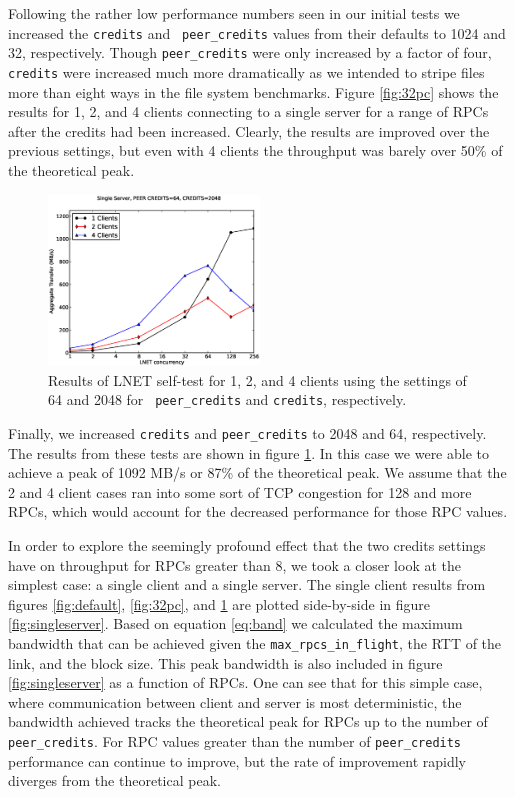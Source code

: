 \documentclass[]{sigplan-proc}
\begin{document}
Following the rather low performance numbers seen in our initial tests we increased the {\tt credits} and {\tt
  peer\_credits} values from their defaults to 1024 and 32, respectively. Though {\tt peer\_credits} were only
increased by a factor of four, {\tt credits} were increased much more dramatically as we intended to stripe
files more than eight ways in the file system benchmarks. Figure \ref{fig:32pc} shows the results for 1, 2,
and 4 clients connecting to a single server for a range of RPCs after the credits had been increased. Clearly,
the results are improved over the previous settings, but even with 4 clients the throughput was barely over
50\% of the theoretical peak.  

\begin{figure}
\centering
\includegraphics[width=0.50\textwidth]{figures/64pc_plot.eps}
\caption{Results of LNET self-test for 1, 2, and 4 clients using the settings of 64 and 2048 for {\tt
    peer\_credits} and {\tt credits}, respectively.}
\label{fig:64pc}
\end{figure}

Finally, we increased {\tt credits} and {\tt peer\_credits} to 2048 and 64, respectively. The results from
these tests are shown in figure \ref{fig:64pc}. In this case we were able to achieve a peak of 1092 MB/s or
87\% of the theoretical peak. We assume that the 2 and 4 client cases ran into some sort of TCP congestion for
128 and more RPCs, which would account for the decreased performance for those RPC values.

In order to explore the seemingly profound effect that the two credits settings have on throughput for RPCs
greater than 8, we took a closer look at the simplest case: a single client and a single server. The single
client results from figures \ref{fig:default}, \ref{fig:32pc}, and \ref{fig:64pc} are plotted side-by-side in
figure \ref{fig:singleserver}. Based on equation \ref{eq:band} we calculated the maximum bandwidth that can
be achieved given the {\tt max\_rpcs\_in\_flight}, the RTT of the link, and the block size.
This peak bandwidth is also included in figure \ref{fig:singleserver} as a function of RPCs. One can see that
for this simple case, where communication between client and server is most deterministic, the bandwidth
achieved tracks the theoretical peak for RPCs up to the number of {\tt peer\_credits}. For RPC values greater
than the number of {\tt peer\_credits} performance can continue to improve, but the rate of improvement
rapidly diverges from the theoretical peak. 
\end{document}
